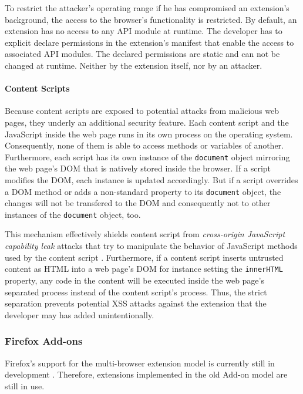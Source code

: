 	To restrict the attacker's operating range if he has compromised an extension's background, the access to the browser's functionality is restricted. By default, an extension has no access to any API module at runtime. The developer has to explicit declare permissions in the extension's manifest that enable the access to associated API modules. The declared permissions are static and can not be changed at runtime. Neither by the extension itself, nor by an attacker.
	
\paragraph{Content Scripts}

	Because content scripts are exposed to potential attacks from malicious web pages, they underly an additional security feature. Each content script and the JavaScript inside the web page runs in its own process on the operating system. Consequently, none of them is able to access methods or variables of another. Furthermore, each script has its own instance of the \texttt{document} object mirroring the web page's DOM that is natively stored inside the browser. If a script modifies the DOM, each instance is updated accordingly. But if a script overrides a DOM method or adds a non-standard property to its \texttt{document} object, the changes will not be transfered to the DOM and consequently not to other instances of the \texttt{document} object, too.	
	
	This mechanism effectively shields content script from \textit{cross-origin JavaScript capability leak} attacks that try to manipulate the behavior of JavaScript methods used by the content script \cite{Carlini:2012:EGC:2362793.2362800, Barth:2009:CJC:1855768.1855780}. Furthermore, if a content script inserts untrusted content as HTML into a web page's DOM for instance setting the \texttt{innerHTML} property, any code in the content will be executed inside the web page's separated process instead of the content script's process. Thus, the strict separation prevents potential XSS attacks against the extension that the developer may has added unintentionally.

\subsubsection{Firefox Add-ons}

	Firefox's support for the multi-browser extension model is currently still in development \cite{mozillaWebExtensionStatus}. Therefore, extensions implemented in the old Add-on model are still in use. 
	
